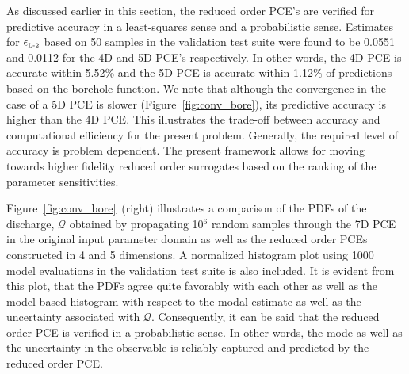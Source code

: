 As discussed earlier in this section, the reduced order PCE's are verified for
predictive accuracy in a least-squares sense and a probabilistic sense.
Estimates for $\epsilon_{\mbox{\tiny{L-2}}}$ based on 50 samples in the
validation test suite were
found to be 0.0551 and 0.0112 for the 4D and 5D PCE's respectively. In other
words, the 4D PCE is accurate within 5.52$\%$ and the 5D PCE is accurate within
1.12$\%$ of predictions based on the borehole function. We note  that although
the convergence in the case of a 5D PCE is slower (Figure~\ref{fig:conv_bore}),
its predictive accuracy is higher than the 4D PCE. This illustrates the
trade-off between accuracy and computational efficiency for the present 
problem. Generally, the required level of accuracy is problem dependent. 
The present framework allows for moving towards higher fidelity 
reduced order surrogates based on the ranking of the parameter sensitivities. 
 


Figure~\ref{fig:conv_bore}~(right) illustrates a comparison of the PDFs
of the
discharge, $\mathcal{Q}$ obtained by propagating 10$^6$ random
samples through the 7D PCE in the original input parameter domain as well as
the reduced order PCEs constructed in 4 and 5 dimensions. A normalized histogram
plot using 1000 model evaluations in the validation test suite is also included.
It is evident from this plot, that the PDFs agree quite favorably with each
other as well as the model-based histogram with respect to the modal estimate
as well as the uncertainty associated with $\mathcal{Q}$. 
Consequently, it can be said that the reduced order PCE is verified in a
probabilistic sense. In other words, the mode as well as the uncertainty in the
observable is reliably captured and predicted by the reduced order PCE. 
% 
